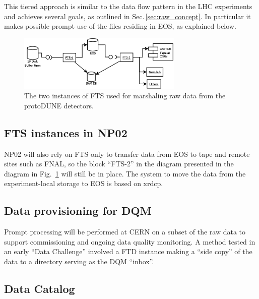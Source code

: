 \documentclass[12pt]{article}
\begin{document}
This tiered approach is similar to the data flow pattern in the LHC experiments and achieves several goals,
as outlined in Sec.\,\ref{sec:raw_concept}. In particular
it makes possible prompt use of the files residing in EOS, as explained below.

\begin{figure}[tbh]
  \centering
  \includegraphics[width=0.7\textwidth]{figures/ftsinstances_v2.png}
  \caption{The two instances of FTS used for marshaling raw data from the protoDUNE detectors.}
  \label{fig:ftsinstances}
\end{figure}

\subsection{FTS instances in NP02}
NP02 will also rely on FTS only to transfer data from EOS to tape and remote sites such as FNAL,
so the block ``FTS-2'' in the diagram presented in the diagram in Fig.~\ref{fig:ftsinstances} will still be in place.
The system to move the data from the experiment-local storage to EOS is based on xrdcp.

\subsection{Data provisioning for DQM}
\label{sec:prompt}

Prompt processing will be performed at CERN on a subset of the raw
data to support commissioning and ongoing data quality monitoring.
A method tested in an early ``Data Challenge'' involved a FTD instance
making a ``side copy'' of the data to a directory serving as the DQM ``inbox''.



\subsection{Data Catalog}
\label{sec:sam}
\end{document}

